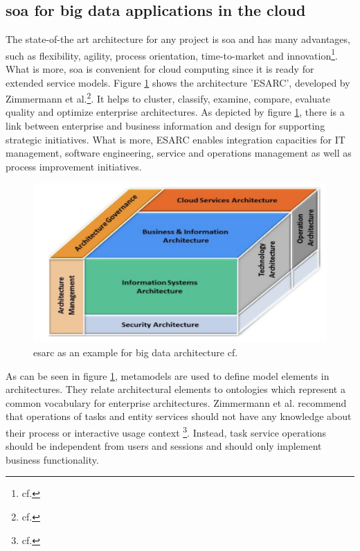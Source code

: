 \subsection{\ac{soa} for big data applications in the cloud}
The state-of-the art architecture for any project is \ac{soa} and has many advantages, such as flexibility, agility, process orientation, time-to-market and innovation\footnote{cf.\autocite{zimmermann}}. What is more, \ac{soa} is convenient for cloud computing since it is ready for extended service models.
Figure \ref{esarc_example} shows the architecture 'ESARC', developed by Zimmermann et al.\footnote{cf.\autocite{zimmermann}}. It helps to cluster, classify, examine, compare, evaluate quality and optimize enterprise architectures. As depicted by figure \ref{esarc_example}, there is a link between enterprise and business information and design for supporting strategic initiatives. What is more, ESARC enables integration capacities for \ac{IT} management, software engineering, service and operations management as well as process improvement initiatives.

\begin{figure}[htbp]
	\centering
	\includegraphics[width=1\textwidth]{images/esarc_cube.png}
	\caption{\ac{esarc} as an example for big data architecture cf.\autocite{zimmermann}}
	\label{esarc_example}
\end{figure}

As can be seen in figure \ref{esarc_example}, metamodels are used to define model elements in architectures. They relate architectural elements to ontologies which represent a common vocabulary for enterprise architectures.
Zimmermann et al. recommend that operations of tasks and entity services should not have any knowledge about their process or interactive usage context \footnote{cf.\autocite{zimmermann}}. Instead, task service operations should be independent from users and sessions and should only implement business functionality.

